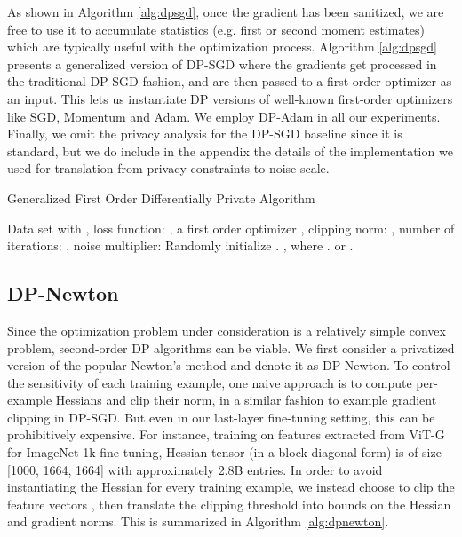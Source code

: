 \documentclass[letterpaper]{article} \usepackage{fullpage}
\begin{document}
As shown in Algorithm \ref{alg:dpsgd}, once the gradient has been sanitized, we are free to use it to accumulate statistics (e.g. first or second moment estimates) which are typically useful with the optimization process. Algorithm \ref{alg:dpsgd} presents a generalized version of DP-SGD where the gradients get processed in the traditional DP-SGD fashion, and are then passed to a first-order optimizer as an input. This lets us instantiate DP versions of well-known first-order optimizers like SGD, Momentum and Adam. We employ DP-Adam in all our experiments. Finally, we omit the privacy analysis for the DP-SGD baseline since it is standard, but we do include in the appendix the details of the implementation we used for translation from privacy constraints to noise scale.

\begin{algorithm}[ht]
\caption{Generalized First Order Differentially Private Algorithm}
\begin{algorithmic}[1]
\REQUIRE Data set  with , loss function: , a first order optimizer , clipping norm: , 
number of iterations: , noise multiplier: 
\STATE Randomly initialize .
\FOR{}
{\STATE {}, where {}.\label{step:clip}}
\STATE 
{\label{step:noiseDPSGD}}
\ENDFOR
{  or \label{eq:lastDPSGD}.}
\end{algorithmic}
\label{alg:dpsgd}
\end{algorithm}

\subsection{DP-Newton}
Since the optimization problem under consideration is a relatively simple convex problem, second-order DP algorithms can be viable. We first consider a privatized version of the popular Newton's method and denote it as DP-Newton. To control the sensitivity of each training example, one naive approach is to compute per-example Hessians and clip their norm, in a similar fashion to example gradient clipping in DP-SGD. But even in our last-layer fine-tuning setting, this can be prohibitively expensive. For instance, training on features extracted from ViT-G for ImageNet-1k fine-tuning, Hessian tensor (in a block diagonal form) is of size [1000, 1664, 1664] with approximately 2.8B entries. In order to avoid instantiating the Hessian for every training example, we instead choose to clip the feature vectors , then translate the clipping threshold into bounds on the Hessian and gradient norms. This is summarized in Algorithm \ref{alg:dpnewton}.
\end{document}
